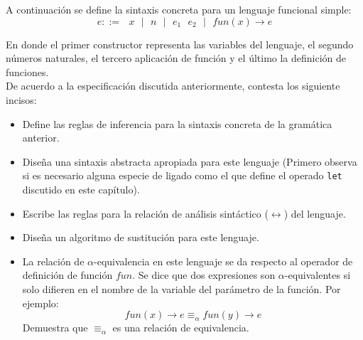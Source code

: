     \bigskip

   \begin{exercise}
        A continuación se define la sintaxis concreta para un lenguaje funcional simple:
        \[ e ::=  \text{ $x$ } \text{$|$} \text{ $n$  }\text{$|$} \text{ } e_1 \text{ } e_2 \text{ } \text{$|$} \text{ } fun(x) \rightarrow e \]

    En donde el primer constructor representa las variables del lenguaje, el segundo números naturales,
    el tercero aplicación de función y el último la definición de funciones.\\

    De acuerdo a la especificación discutida anteriormente, contesta los siguiente incisos: \\
    \begin{itemize}
        \item Define las reglas de inferencia para la sintaxis concreta de la gramática anterior.
        \item Diseña una sintaxis abstracta apropiada para este lenguaje (Primero observa si es necesario alguna especie de ligado como el que define el operado \texttt{let} discutido en este capítulo).
        \item Escribe las reglas para la relación de análisis sintáctico ($\longleftrightarrow$) del lenguaje.
        \item Diseña un algoritmo de sustitución para este lenguaje.
        \item La relación de $\alpha$-equivalencia en este lenguaje se da respecto al operador de definición de función $fun$. Se dice que dos expresiones son $\alpha$-equivalentes si solo difieren en el nombre de la variable del parámetro de la función. Por ejemplo:
              \[ fun(x) \rightarrow e \equiv_\alpha fun(y) \rightarrow e \]
              Demuestra que $\equiv_\alpha$ es una relación de equivalencia.
    \end{itemize}

   \end{exercise}
    